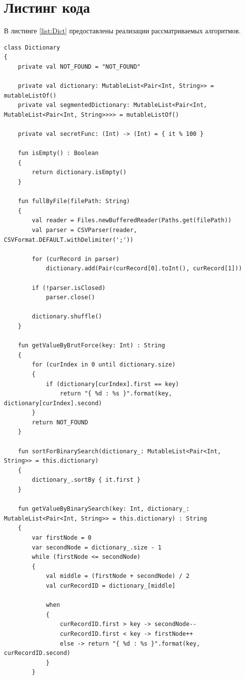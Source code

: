 \documentclass[12pt]{report}
\begin{document}
\section{Листинг кода}
В листинге \ref{list:Dict} предоставлены реализации рассматриваемых алгоритмов.
\begin{lstlisting}[caption=Реализации рассматриваемых алгоритмов поиска,
label={list:Dict}]
class Dictionary
{
    private val NOT_FOUND = "NOT_FOUND"

    private val dictionary: MutableList<Pair<Int, String>> = mutableListOf()
    private val segmentedDictionary: MutableList<Pair<Int, MutableList<Pair<Int, String>>>> = mutableListOf()

    private val secretFunc: (Int) -> (Int) = { it % 100 }

    fun isEmpty() : Boolean
    {
        return dictionary.isEmpty()
    }

    fun fullByFile(filePath: String)
    {
        val reader = Files.newBufferedReader(Paths.get(filePath))
        val parser = CSVParser(reader, CSVFormat.DEFAULT.withDelimiter(';'))

        for (curRecord in parser)
            dictionary.add(Pair(curRecord[0].toInt(), curRecord[1]))

        if (!parser.isClosed)
            parser.close()

        dictionary.shuffle()
    }

    fun getValueByBrutForce(key: Int) : String
    {
        for (curIndex in 0 until dictionary.size)
        {
            if (dictionary[curIndex].first == key)
                return "{ %d : %s }".format(key, dictionary[curIndex].second)
        }
        return NOT_FOUND
    }

    fun sortForBinarySearch(dictionary_: MutableList<Pair<Int, String>> = this.dictionary)
    {
        dictionary_.sortBy { it.first }
    }

    fun getValueByBinarySearch(key: Int, dictionary_: MutableList<Pair<Int, String>> = this.dictionary) : String
    {
        var firstNode = 0
        var secondNode = dictionary_.size - 1
        while (firstNode <= secondNode)
        {
            val middle = (firstNode + secondNode) / 2
            val curRecordID = dictionary_[middle]

            when
            {
                curRecordID.first > key -> secondNode--
                curRecordID.first < key -> firstNode++
                else -> return "{ %d : %s }".format(key, curRecordID.second)
            }
        }


\end{lstlisting}
\end{document}
